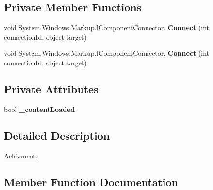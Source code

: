 \subsection*{Private Member Functions}
\begin{DoxyCompactItemize}
\item 
\mbox{\label{class_t_h_b___plugin___social_1_1_achivments_1_1_achivments_a1ba800d5953f08b8d81e731da0c441ac}} 
void System.\+Windows.\+Markup.\+I\+Component\+Connector. {\bfseries Connect} (int connection\+Id, object target)
\item 
\mbox{\label{class_t_h_b___plugin___social_1_1_achivments_1_1_achivments_a1ba800d5953f08b8d81e731da0c441ac}} 
void System.\+Windows.\+Markup.\+I\+Component\+Connector. {\bfseries Connect} (int connection\+Id, object target)
\end{DoxyCompactItemize}
\subsection*{Private Attributes}
\begin{DoxyCompactItemize}
\item 
\mbox{\label{class_t_h_b___plugin___social_1_1_achivments_1_1_achivments_ab8b036a3f1931db6974296216d403fd0}} 
bool {\bfseries \+\_\+content\+Loaded}
\end{DoxyCompactItemize}


\subsection{Detailed Description}
\mbox{\hyperlink{class_t_h_b___plugin___social_1_1_achivments_1_1_achivments}{Achivments}} 



\subsection{Member Function Documentation}
\mbox{\label{class_t_h_b___plugin___social_1_1_achivments_1_1_achivments_a6f673611ddba423db8bacc8dbdff7a00}} 

